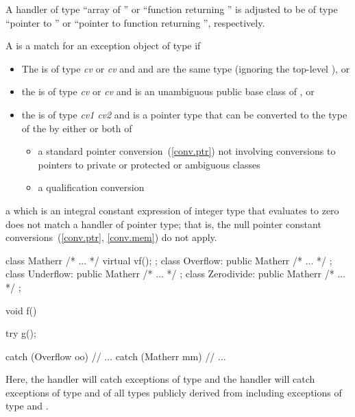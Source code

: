 \pnum
A handler of type ``array of
''
or ``function returning
''
is adjusted to be of type ``pointer to
''
or ``pointer to function
returning
'',
respectively.

\pnum
{}%
A
is a match for
an exception object
of type
if
\begin{itemize}
\item%
The
is of type
\textit{cv}
or
\textit{cv}
and
and
are the same type (ignoring the top-level
),
or
\item%
the
is of type
\textit{cv}
or
\textit{cv}
and
is an unambiguous public base class of
,
or
\item%
the
is of type
\textit{cv1}
\textit{cv2}
and
is a pointer type that can be
converted to the type of the
by either or both of
\begin{itemize}

\item%
a standard pointer conversion~(\ref{conv.ptr}) not involving conversions
to pointers to private or protected or ambiguous classes
\item%
a qualification conversion

\end{itemize}

\end{itemize}

\enternote
a
which is an integral constant expression of integer type
that evaluates to zero does not match a handler of pointer type;
that is, the null pointer constant conversions~(\ref{conv.ptr},
\ref{conv.mem}) do not apply.
\exitnote

\pnum
\enterexample
\begin{codeblock}
class Matherr { /* ... */ virtual vf(); };
class Overflow: public Matherr { /* ... */ };
class Underflow: public Matherr { /* ... */ };
class Zerodivide: public Matherr { /* ... */ };

void f()
{
    try {
	g();
    }
    
    catch (Overflow oo) {
	// ...
    }
    catch (Matherr mm) {
	// ...
    }
}
\end{codeblock}
Here, the
handler will catch exceptions of type
and the
handler will catch exceptions of type
and of all types publicly derived from
including exceptions of type
and
.
\exitexample

